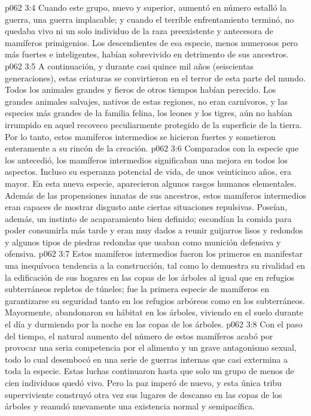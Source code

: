 \vs p062 3:4 Cuando este grupo, nuevo y superior, aumentó en número estalló la guerra, una guerra implacable; y cuando el terrible enfrentamiento terminó, no quedaba vivo ni un solo individuo de la raza preexistente y antecesora de mamíferos primigenios. Los descendientes de esa especie, menos numerosos pero más fuertes e inteligentes, habían sobrevivido en detrimento de sus ancestros.
\vs p062 3:5 A continuación, y durante casi quince mil años (seiscientas generaciones), estas criaturas se convirtieron en el terror de esta parte del mundo. Todos los animales grandes y fieros de otros tiempos habían perecido. Los grandes animales salvajes, nativos de estas regiones, no eran carnívoros, y las especies más grandes de la familia felina, los leones y los tigres, aún no habían irrumpido en aquel recoveco peculiarmente protegido de la superficie de la tierra. Por lo tanto, estos mamíferos intermedios se hicieron fuertes y sometieron enteramente a su rincón de la creación.
\vs p062 3:6 \pc Comparados con la especie que los antecedió, los mamíferos intermedios significaban una mejora en todos los aspectos. Incluso su esperanza potencial de vida, de unos veinticinco años, era mayor. En esta nueva especie, aparecieron algunos rasgos humanos elementales. Además de las propensiones innatas de sus ancestros, estos mamíferos intermedios eran capaces de mostrar disgusto ante ciertas situaciones repulsivas. Poseían, además, un instinto de acaparamiento bien definido; escondían la comida para poder consumirla más tarde y eran muy dados a reunir guijarros lisos y redondos y algunos tipos de piedras redondas que usaban como munición defensiva y ofensiva.
\vs p062 3:7 Estos mamíferos intermedios fueron los primeros en manifestar una inequívoca tendencia a la construcción, tal como lo demuestra su rivalidad en la edificación de sus hogares en las copas de los árboles al igual que en refugios subterráneos repletos de túneles; fue la primera especie de mamíferos en garantizarse su seguridad tanto en los refugios arbóreos como en los subterráneos. Mayormente, abandonaron su hábitat en los árboles, viviendo en el suelo durante el día y durmiendo por la noche en las copas de los árboles.
\vs p062 3:8 Con el paso del tiempo, el natural aumento del número de estos mamíferos acabó por provocar una seria competencia por el alimento y un grave antagonismo sexual, todo lo cual desembocó en una serie de guerras internas que casi extermina a toda la especie. Estas luchas continuaron hasta que solo un grupo de menos de cien individuos quedó vivo. Pero la paz imperó de nuevo, y esta única tribu superviviente construyó otra vez sus lugares de descanso en las copas de los árboles y reanudó nuevamente una existencia normal y semipacífica.
